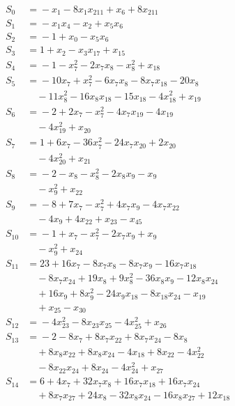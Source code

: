 \begingroup\footnotesize
\setlength{\jot}{2pt}\allowdisplaybreaks[4]
\begin{align*}
S_{0} &={} -x_{1} -8x_{1}x_{211} +x_{6} +8x_{211} \\
S_{1} &={} -x_{1}x_{4} -x_{2} +x_{5}x_{6} \\
S_{2} &={} -1 +x_{0} -x_{5}x_{6} \\
S_{3} &={} 1 +x_{2} -x_{3}x_{17} +x_{15} \\
S_{4} &={} -1 -x_{7}^{2} -2x_{7}x_{8} -x_{8}^{2} +x_{18} \\
S_{5} &={} -10x_{7} +x_{7}^{2} -6x_{7}x_{8} -8x_{7}x_{18} -20x_{8} \\
&\quad{} -11x_{8}^{2} -16x_{8}x_{18} -15x_{18} -4x_{18}^{2} +x_{19} \\
S_{6} &={} -2 +2x_{7} -x_{7}^{2} -4x_{7}x_{19} -4x_{19} \\
&\quad{} -4x_{19}^{2} +x_{20} \\
S_{7} &={} 1 +6x_{7} -36x_{7}^{2} -24x_{7}x_{20} +2x_{20} \\
&\quad{} -4x_{20}^{2} +x_{21} \\
S_{8} &={} -2 -x_{8} -x_{8}^{2} -2x_{8}x_{9} -x_{9} \\
&\quad{} -x_{9}^{2} +x_{22} \\
S_{9} &={} -8 +7x_{7} -x_{7}^{2} +4x_{7}x_{9} -4x_{7}x_{22} \\
&\quad{} -4x_{9} +4x_{22} +x_{23} -x_{45} \\
S_{10} &={} -1 +x_{7} -x_{7}^{2} -2x_{7}x_{9} +x_{9} \\
&\quad{} -x_{9}^{2} +x_{24} \\
S_{11} &={} 23 +16x_{7} -8x_{7}x_{8} -8x_{7}x_{9} -16x_{7}x_{18} \\
&\quad{} -8x_{7}x_{24} +19x_{8} +9x_{8}^{2} -36x_{8}x_{9} -12x_{8}x_{24} \\
&\quad{} +16x_{9} +8x_{9}^{2} -24x_{9}x_{18} -8x_{18}x_{24} -x_{19} \\
&\quad{} +x_{25} -x_{30} \\
S_{12} &={} -4x_{23}^{2} -8x_{23}x_{25} -4x_{25}^{2} +x_{26} \\
S_{13} &={} -2 -8x_{7} +8x_{7}x_{22} +8x_{7}x_{24} -8x_{8} \\
&\quad{} +8x_{8}x_{22} +8x_{8}x_{24} -4x_{18} +8x_{22} -4x_{22}^{2} \\
&\quad{} -8x_{22}x_{24} +8x_{24} -4x_{24}^{2} +x_{27} \\
S_{14} &={} 6 +4x_{7} +32x_{7}x_{8} +16x_{7}x_{18} +16x_{7}x_{24} \\
&\quad{} +8x_{7}x_{27} +24x_{8} -32x_{8}x_{24} -16x_{8}x_{27} +12x_{18} \\

\end{align*}
